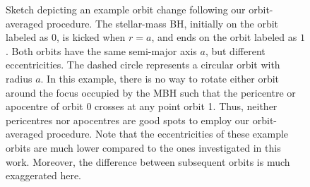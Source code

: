 \documentclass[desactivate]{aa}
\begin{document}
        \begin{figure}
            \centering
            \caption{Sketch depicting an example orbit change following our orbit-averaged procedure. The stellar-mass BH, initially on the orbit labeled as $0$, is kicked when $r=a$, and ends on the orbit labeled as $1$. Both orbits have the same semi-major axis $a$, but different eccentricities. The dashed circle represents a circular orbit with radius $a$. In this example, there is no way to rotate either orbit around the focus occupied by the MBH such that the pericentre or apocentre of orbit 0 crosses at any point orbit 1. Thus, neither pericentres nor apocentres are good spots to employ our orbit-averaged procedure. Note that the eccentricities of these example orbits are much lower compared to the ones investigated in this work. Moreover, the difference between subsequent orbits is much exaggerated here.}
            \label{fig:sketch}
        \end{figure}
\end{document}
